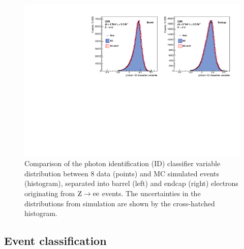 \documentclass[11pt,twoside,a4paper,cmspaper,final,collab]{cms-tdr}
\begin{document}
\begin{figure}[htbp]
  \begin{center}
    \includegraphics[width=0.98\linewidth]{figures/hgg_idmva_noratio.pdf}
    \caption{
      Comparison of the photon identification (ID) classifier variable distribution between 8\TeV
      data (points) and MC simulated events (histogram),
      separated into barrel (left) and endcap (right) electrons originating from $\mathrm{Z}\to \mathrm{e}\mathrm{e}$ events.
      The uncertainties in the distributions from simulation are shown by the cross-hatched histogram.
    }
    \label{fig:hgg_idmva}
  \end{center}
\end{figure}



\subsection{Event classification}
\label{sec:hgg_diphotonBDT}
\end{document}

